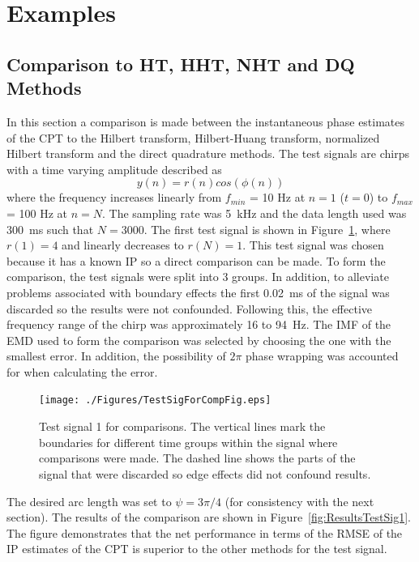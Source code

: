 \documentclass[a4paper]{IEEEtran}
\begin{document}
\section{Examples}
\subsection{Comparison to HT, HHT, NHT and DQ Methods}
In this section a comparison is made between the instantaneous phase estimates of the CPT to the Hilbert transform, Hilbert-Huang transform, normalized Hilbert transform and the direct quadrature methods. The test signals are chirps with a time varying amplitude described as
\begin{equation}\label{TestSigNoNoise}
    y(n)=r\left(n\right)cos\left(\phi\left(n\right)\right)
\end{equation}
where the frequency increases linearly from $f_{min}$ = 10 Hz at $n=1$ ($t=0$) to $f_{max}$ = 100 Hz at $n=N$. The sampling rate was 5~kHz and the data length used was 300~ms such that $N = 3000$. The first test signal is shown in Figure~\ref{fig:TestSig1}, where $r(1) = 4$ and linearly decreases to $r(N) = 1$. This test signal was chosen because it has a known IP so a direct comparison can be made. To form the comparison, the test signals were split into 3 groups. In addition, to alleviate problems associated with boundary effects the first 0.02~ms of the signal was discarded so the results were not confounded. Following this, the effective frequency range of the chirp was approximately 16 to 94~Hz. The IMF of the EMD used to form the comparison was selected by choosing the one with the smallest error. In addition, the possibility of $2\pi$ phase wrapping was accounted for when calculating the error.

\begin{figure}[htbp]
	\centering
		\texttt{[image: ./Figures/TestSigForCompFig.eps]}
	\caption{Test signal 1 for comparisons. The vertical lines mark the boundaries for different time groups within the signal where comparisons were made. The dashed line shows the parts of the signal that were discarded so edge effects did not confound results.}
	\label{fig:TestSig1}
\end{figure}

The desired arc length was set to $\psi=3\pi/4$ (for consistency with the next section). The results of the comparison are shown in Figure~\ref{fig:ResultsTestSig1}. The figure demonstrates that the net performance in terms of the RMSE of the IP estimates of the CPT is superior to the other methods for the test signal.
\end{document}
